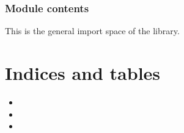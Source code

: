 \documentclass[letterpaper,10pt,english]{sphinxmanual}
\begin{document}
\subsection{Module contents}
\label{\detokenize{docstrings/ifa_smeargle:module-ifa_smeargle}}\label{\detokenize{docstrings/ifa_smeargle:module-contents}}
This is the general import space of the library.


\chapter{Indices and tables}
\label{\detokenize{index:indices-and-tables}}\begin{itemize}
\item {} 

\item {} 

\item {} 

\end{itemize}
\end{document}
